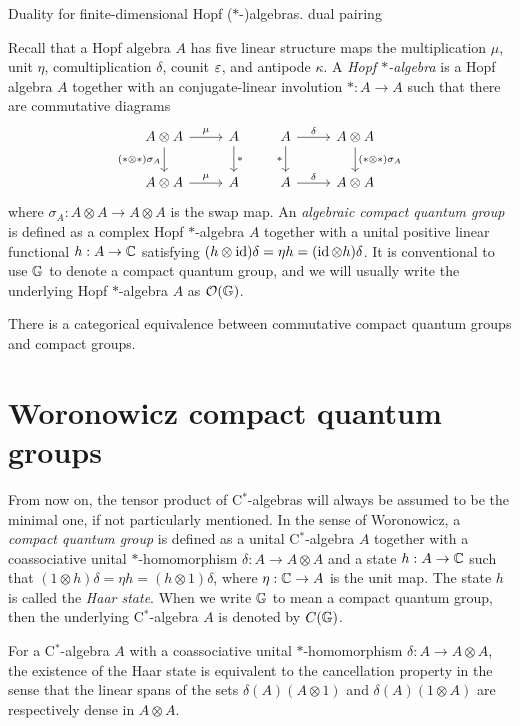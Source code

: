 \documentclass{../../large}
\begin{document}
Duality for finite-dimensional Hopf ($*$-)algebras.
dual pairing






\begin{prb}
Recall that a Hopf algebra $A$ has five linear structure maps the multiplication $\mu$, unit $\eta$, comultiplication $\delta$, counit $\varepsilon$, and antipode $\kappa$.
A \emph{Hopf $*$-algebra} is a Hopf algebra $A$ together with an conjugate-linear involution $*:A\to A$ such that there are commutative diagrams
\[\begin{tikzcd}
A\otimes A \rar{\mu}\dar[swap]{(*\otimes*)\sigma_A} & A \dar{*}\\
A\otimes A \rar{\mu} & A
\end{tikzcd}
\qquad
\begin{tikzcd}
A \rar{\delta}\dar[swap]{*} & A\otimes A \dar{(*\otimes*)\sigma_A}\\
A \rar{\delta} & A\otimes A
\end{tikzcd}\]
where $\sigma_A:A\otimes A\to A\otimes A$ is the swap map.
An \emph{algebraic compact quantum group} is defined as a complex Hopf $*$-algebra $A$ together with a unital positive linear functional $h:A\to\mathbb{C}$ satisfying $(h\otimes\operatorname{id})\delta=\eta h=(\operatorname{id}\otimes h)\delta$.
It is conventional to use $\mathbb{G}$ to denote a compact quantum group, and we will usually write the underlying Hopf $*$-algebra $A$ as $\mathcal{O}(\mathbb{G})$.
\begin{parts}
\item There is a categorical equivalence between commutative compact quantum groups and compact groups.
\end{parts}
\end{prb}


\section{Woronowicz compact quantum groups}

\begin{prb}
From now on, the tensor product of C$^*$-algebras will always be assumed to be the minimal one, if not particularly mentioned.
In the sense of Woronowicz, a \emph{compact quantum group} is defined as a unital C$^*$-algebra $A$ together with a coassociative unital $*$-homomorphism $\delta:A\to A\otimes A$ and a state $h:A\to\mathbb{C}$ such that $(1\otimes h)\delta=\eta h=(h\otimes1)\delta$, where $\eta:\mathbb{C}\to A$ is the unit map.
The state $h$ is called the \emph{Haar state}.
When we write $\mathbb{G}$ to mean a compact quantum group, then the underlying C$^*$-algebra $A$ is denoted by $C(\mathbb{G})$.
\begin{parts}
\item For a C$^*$-algebra $A$ with a coassociative unital $*$-homomorphism $\delta:A\to A\otimes A$, the existence of the Haar state is equivalent to the cancellation property in the sense that the linear spans of the sets $\delta(A)(A\otimes1)$ and $\delta(A)(1\otimes A)$ are respectively dense in $A\otimes A$.
\end{parts}
\end{prb}
\end{document}
